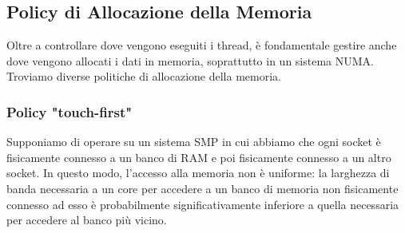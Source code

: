 \subsection{Policy di Allocazione della Memoria}
Oltre a controllare dove vengono eseguiti i thread, è fondamentale gestire anche dove vengono allocati i dati in memoria, soprattutto in un sistema NUMA. Troviamo diverse politiche di allocazione della memoria.
\subsubsection*{Policy "touch-first"}
Supponiamo di operare su un sistema SMP in cui abbiamo che ogni socket è fisicamente connesso a un banco di RAM e poi fisicamente connesso a un altro socket. In questo modo, l'accesso alla memoria non è uniforme: la larghezza di banda necessaria a un core per accedere a un banco di memoria non fisicamente connesso ad esso è probabilmente significativamente inferiore a quella necessaria per accedere al banco più vicino.

